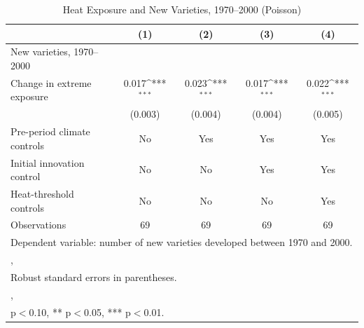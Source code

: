 \begin{table}[htbp]\centering
\def\sym#1{\ifmmode^{#1}\else\(^{#1}\)\fi}
\caption{Heat Exposure and New Varieties, 1970--2000 (Poisson)}
\begin{tabular}{l*{4}{c}}
\toprule
                    &\multicolumn{1}{c}{(1)}&\multicolumn{1}{c}{(2)}&\multicolumn{1}{c}{(3)}&\multicolumn{1}{c}{(4)}\\
\midrule
New varieties, 1970--2000&                     &                     &                     &                     \\
Change in extreme exposure&       0.017\sym{***}&       0.023\sym{***}&       0.017\sym{***}&       0.022\sym{***}\\
                    &     (0.003)         &     (0.004)         &     (0.004)         &     (0.005)         \\
\midrule
Pre-period climate controls&          No         &         Yes         &         Yes         &         Yes         \\
Initial innovation control&          No         &          No         &         Yes         &         Yes         \\
Heat-threshold controls&          No         &          No         &          No         &         Yes         \\
Observations        &          69         &          69         &          69         &          69         \\
\bottomrule
\multicolumn{5}{l}{\footnotesize Dependent variable: number of new varieties developed between 1970 and 2000.}\\
\multicolumn{5}{l}{\footnotesize ,}\\
\multicolumn{5}{l}{\footnotesize Robust standard errors in parentheses.}\\
\multicolumn{5}{l}{\footnotesize ,}\\
\multicolumn{5}{l}{\footnotesize * p$<$0.10, ** p$<$0.05, *** p$<$0.01.}\\
\end{tabular}
\end{table}
